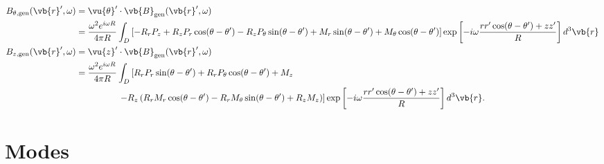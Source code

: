 \documentclass[11pt,SymmetricalJury]{inrsthesis/inrsthesis}
\begin{document}
\begin{subequations}
\begin{align}
   B_{\theta,\text{gen}}(\vb{r}',\omega)
        &= \vu{\theta}'\cdot\vb{B}_\text{gen}(\vb{r}',\omega) \nonumber\\
        &= \frac{\omega^2e^{i\omega R}}{4\pi R} \int_D
        \left[
          -R_rP_z+R_zP_r\cos(\theta-\theta')-R_zP_\theta\sin(\theta-\theta')+M_r\sin(\theta-\theta')+M_\theta\cos(\theta-\theta')\right]\exp\left[{-i\omega \frac{rr'\cos(\theta-\theta')+zz'}{R}}\right]d^3\vb{r}\\
   B_{z,\text{gen}}(\vb{r}',\omega)
        &= \vu{z}'\cdot\vb{B}_\text{gen}(\vb{r}',\omega) \nonumber\\
        &= \frac{\omega^2e^{i\omega R}}{4\pi R} \int_D
          \left[R_rP_r\sin(\theta-\theta')+R_rP_\theta\cos(\theta-\theta')+M_z \right.\nonumber\\
        &\phantom{\frac{\omega^2e^{i\omega R}}{4\pi R} \int_D}\left.
          -R_z \left(R_rM_r\cos(\theta-\theta')-R_rM_\theta\sin(\theta-\theta')+R_zM_z\right)\right]
          \exp\left[{-i\omega \frac{rr'\cos(\theta-\theta')+zz'}{R}}\right]d^3\vb{r}.
  \end{align}
  \end{subequations}

\section{Modes}
\end{document}
